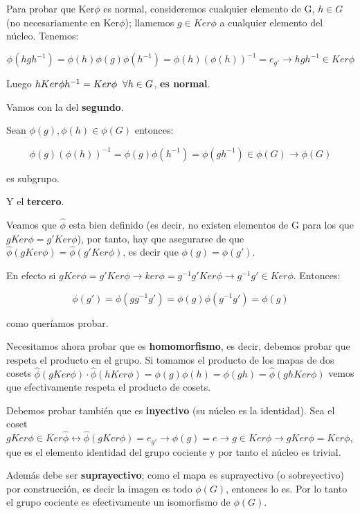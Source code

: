 \documentclass{article}
\begin{document}
Para probar que Ker$\phi$ es normal, consideremos cualquier elemento de G, $h\in G$ (no necesariamente en Ker$\phi$); llamemos $g\in Ker \phi$ a cualquier elemento del núcleo. Tenemos:

$$\phi (hgh^{-1})=\phi(h)\phi (g)\phi (h^{-1})=\phi(h)(\phi(h))^{-1}=e_{g'}\rightarrow hgh^{-1}\in Ker\phi$$


Luego $hKer\phi h^{-1}=Ker \phi \hspace{0.2cm} \forall h\in G$, \textbf{es normal}.

\bigskip
Vamos con la del \textbf{segundo}.
\smallskip

Sean $\phi (g),\phi (h)\in  \phi(G)$ entonces:

$$\phi (g)(\phi(h))^{-1}=\phi (g)\phi (h^{-1})=\phi (gh^{-1})\in \phi (G)\rightarrow \phi (G)$$

es subgrupo.

\bigskip
Y el \textbf{tercero}.

Veamos que $\hat{\phi}$ esta bien definido (es decir, no existen elementos de G para los que $gKer\phi =g'Ker\phi$), por tanto, hay que asegurarse de que $\hat{\phi} (gKer\phi)=\hat{\phi}(g'Ker\phi)$, es decir que $\phi(g)=\phi (g')$.
\smallskip

En efecto si $gKer\phi =g'Ker \phi \rightarrow ker\phi=g^{-1}g'Ker\phi \rightarrow g^{-1} g' \in Ker \phi$. Entonces:

$$ \phi (g')= \phi (gg^{-1}g')=\phi (g)\phi (g^{-1}g')=\phi (g)$$

como queríamos probar.

\smallskip
Necesitamos ahora probar que es \textbf{homomorfismo}, es decir, debemos probar que respeta el producto en el grupo. Si tomamos el producto de los mapas de dos cosets $\hat{\phi} (gKer\phi)\cdot \hat{\phi} (hKer\phi)=\phi (g)\phi (h)=\phi (gh)=\hat{\phi} (ghKer\phi)$ vemos que efectivamente respeta el producto de cosets.

\smallskip
Debemos probar también que es \textbf{inyectivo} (su núcleo es la identidad). Sea el coset $gKer\phi \in Ker\hat{\phi} \leftrightarrow \hat{\phi} (gKer\phi)=e_{g'}\rightarrow \phi (g)=e \rightarrow g\in Ker \phi \rightarrow gKer\phi =Ker\phi$, que es el elemento identidad del grupo cociente y por tanto el núcleo es trivial.

\smallskip
Además debe ser \textbf{suprayectivo}; como el mapa es suprayectivo (o sobreyectivo) por construcción, es decir la imagen es todo $\phi (G)$, entonces lo es. Por lo tanto el grupo cociente es efectivamente un isomorfismo de $\phi (G)$.
\end{document}
